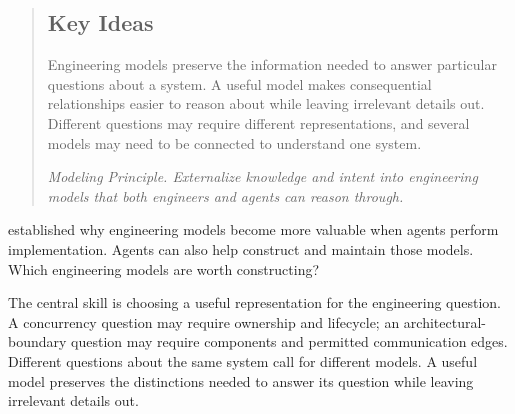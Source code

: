 



\begin{quote}
\mbox{}%
\subsection{Key Ideas}\label{heading:modeling-principle}


Engineering models preserve the information needed to answer particular questions about a system. A useful model makes consequential relationships easier to reason about while leaving irrelevant details out. Different questions may require different representations, and several models may need to be connected to understand one system.

\emph{Modeling Principle. Externalize knowledge and intent into engineering models that both engineers and agents can reason through.}
\end{quote}

 established why engineering models become more valuable when agents perform implementation. Agents can also help construct and maintain those models. Which engineering models are worth constructing?


The central skill is choosing a useful representation for the engineering question. A concurrency question may require ownership and lifecycle; an architectural-boundary question may require components and permitted communication edges. Different questions about the same system call for different models. A useful model preserves the distinctions needed to answer its question while leaving irrelevant details out.


